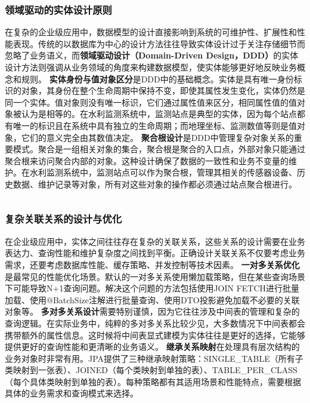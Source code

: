 \subsubsection{领域驱动的实体设计原则}\label{ux9886ux57dfux9a71ux52a8ux7684ux5b9eux4f53ux8bbeux8ba1ux539fux5219}
在复杂的企业级应用中，数据模型的设计直接影响到系统的可维护性、扩展性和性能表现。传统的以数据库为中心的设计方法往往导致实体设计过于关注存储细节而忽略了业务语义，而\textbf{领域驱动设计（Domain-Driven
Design，DDD）}的实体设计方法则强调从业务领域的角度来构建数据模型，使实体能够更好地反映业务概念和规则。
\textbf{实体身份与值对象区分}是DDD中的基础概念。实体是具有唯一身份标识的对象，其身份在整个生命周期中保持不变，即使其属性发生变化，实体仍然是同一个实体。值对象则没有唯一标识，它们通过属性值来区分，相同属性值的值对象被认为是相等的。在水利监测系统中，监测站点是典型的实体，因为每个站点都有唯一的标识且在系统中具有独立的生命周期；而地理坐标、监测数值等则是值对象，它们的意义完全由其数值决定。
\textbf{聚合根设计}是DDD中管理复杂对象关系的重要模式。聚合是一组相关对象的集合，聚合根是聚合的入口点，外部对象只能通过聚合根来访问聚合内部的对象。这种设计确保了数据的一致性和业务不变量的维护。在水利监测系统中，监测站点可以作为聚合根，管理其相关的传感器设备、历史数据、维护记录等对象，所有对这些对象的操作都必须通过站点聚合根进行。
\begin{lstlisting}[language=Java] \end{lstlisting}
\subsubsection{复杂关联关系的设计与优化}\label{ux590dux6742ux5173ux8054ux5173ux7cfbux7684ux8bbeux8ba1ux4e0eux4f18ux5316}
在企业级应用中，实体之间往往存在复杂的关联关系，这些关系的设计需要在业务表达力、查询性能和维护复杂度之间找到平衡。正确设计关联关系不仅要考虑业务需求，还要考虑数据库性能、缓存策略、并发控制等技术因素。
\textbf{一对多关系优化}是最常见的性能优化场景。默认的一对多关系使用懒加载策略，但在某些查询场景下可能导致N+1查询问题。解决这个问题的方法包括使用JOIN
FETCH进行批量加载、使用@BatchSize注解进行批量查询、使用DTO投影避免加载不必要的关联对象等。
\textbf{多对多关系设计}需要特别谨慎，因为它往往涉及中间表的管理和复杂的查询逻辑。在实际业务中，纯粹的多对多关系比较少见，大多数情况下中间表都会携带额外的属性信息。这时候将中间表显式建模为实体往往是更好的选择，它能够提供更好的查询性能和更清晰的业务语义。
\textbf{继承关系映射}在处理具有层次结构的业务对象时非常有用。JPA提供了三种继承映射策略：SINGLE\_TABLE（所有子类映射到一张表）、JOINED（每个类映射到单独的表）、TABLE\_PER\_CLASS（每个具体类映射到单独的表）。每种策略都有其适用场景和性能特点，需要根据具体的业务需求和查询模式来选择。
\begin{lstlisting}[language=Java] \end{lstlisting}

